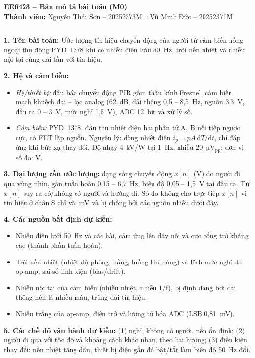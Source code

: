 \documentclass[a4paper,11pt]{article}
\newcommand{\muc}[1]{\par\smallskip\textbf{#1}\enspace}
\begin{document}
\begin{center}
  {\large\bfseries EE6423 – Bản mô tả bài toán (M0)}\\[2pt]
  \textbf{Thành viên:} Nguyễn Thái Sơn – 20252373M \quad·\quad Vũ Minh Đức – 20252371M
\end{center}
\vspace{-4pt}\rule{\linewidth}{0.4pt}

\muc{1. Tên bài toán:} Ước lượng tín hiệu chuyển động của người từ cảm biến hồng ngoại thụ động PYD~1378
khi có nhiễu điện lưới 50~Hz, trôi nền nhiệt và nhiễu nội tại cùng dải tần với tín hiệu.

\muc{2. Hệ và cảm biến:}
\begin{itemize}
  \item \emph{Hệ/thiết bị:} đầu báo chuyển động PIR gồm thấu kính Fresnel, cảm biến, mạch khuếch đại -- lọc analog
        (62~dB, dải thông 0,5 -- 8,5~Hz, nguồn 3,3~V, đầu ra 0 -- 3~V, mức nghỉ 1,5~V), ADC 12~bit và xử lý số.
  \item \emph{Cảm biến:} PYD~1378, đầu thu nhiệt điện hai phần tử A, B nối tiếp ngược cực, có FET lặp nguồn.
        Nguyên lý: dòng nhiệt điện $i_p = pA\,\mathrm{d}T/\mathrm{d}t$, chỉ đáp ứng khi bức xạ thay đổi.
        Độ nhạy 4~kV/W tại 1~Hz, nhiễu 20~µV$_\text{pp}$; đơn vị số đo: V.
\end{itemize}

\muc{3. Đại lượng cần ước lượng:} dạng sóng chuyển động $x[n]$ (V) do người đi qua vùng nhìn, gần tuần hoàn
0,15 -- 6,7~Hz, biên độ 0,05 -- 1,5~V tại đầu ra. Từ $x[n]$ suy ra có/không có người và hướng đi.
Số đo không cho trực tiếp $x[n]$ vì tín hiệu ở chân S chỉ vài mV và bị chồng bởi các nguồn nhiễu dưới đây.

\muc{4. Các nguồn bất định dự kiến:}
\begin{itemize}
  \item Nhiễu điện lưới 50~Hz và các hài, cảm ứng lên dây nối và cực cổng trở kháng cao (thành phần tuần hoàn).
  \item Trôi nền nhiệt (nhiệt độ phòng, nắng, luồng khí nóng) và lệch mức nghỉ do op-amp, sai số linh kiện (bias/drift).
  \item Nhiễu nội tại của cảm biến (nhiễu nhiệt, nhiễu 1/f), bị định dạng bởi dải thông nên là nhiễu màu, trùng dải tín hiệu.
  \item Nhiễu trắng của op-amp, điện trở và lượng tử hóa ADC (LSB 0,81~mV).
\end{itemize}

\muc{5. Các chế độ vận hành dự kiến:} (1) nghỉ, không có người, nền ổn định; (2) người đi qua với tốc độ và khoảng cách
khác nhau, theo hai hướng; (3) điều kiện thay đổi: nền nhiệt tăng dần, thiết bị điện gần đó bật/tắt làm biên độ 50~Hz đổi.
\end{document}
